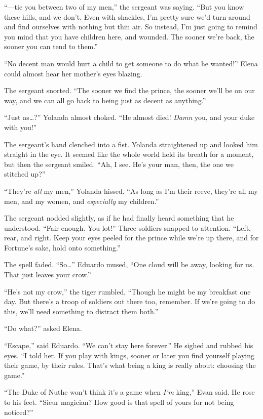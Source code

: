 \documentclass[10pt]{book}
\begin{document}
``---tie you between two of my men,'' the sergeant was saying. ``But you know these hills, and we don't. Even with shackles, I'm pretty sure we'd turn around and find ourselves with nothing but thin air. So instead, I'm just going to remind you mind that you have children here, and wounded.  The sooner we're back, the sooner you can tend to them.''

``No decent man would hurt a child to get someone to do what he wanted!''  Elena could almost hear her mother's eyes blazing.

The sergeant snorted. ``The sooner we find the prince, the sooner we'll be on our way, and we can all go back to being just as decent as anything.''

``Just as{\ldots}?'' Yolanda almost choked. ``He almost died! \emph{Damn} you, and your duke with you!''

The sergeant's hand clenched into a fist. Yolanda straightened up and looked him straight in the eye. It seemed like the whole world held its breath for a moment, but then the sergeant smiled. ``Ah, I see. He's your man, then, the one we stitched up?''

``They're \emph{all} my men,'' Yolanda hissed. ``As long as I'm their reeve, they're all my men, and my women, and \emph{especially} my children.''

The sergeant nodded slightly, as if he had finally heard something that he understood.  ``Fair enough.  You lot!''  Three soldiers snapped to attention.  ``Left, rear, and right.  Keep your eyes peeled for the prince while we're up there, and for Fortune's sake, hold onto something.''

The spell faded.  ``So{\ldots}'' Eduardo mused, ``One cloud will be away, looking for us.  That just leaves your crow.''

``He's not my crow,'' the tiger rumbled, ``Though he might be my breakfast one day.  But there's a troop of soldiers out there too, remember.  If we're going to do this, we'll need something to distract them both.''

``Do what?'' asked Elena.

``Escape,'' said Eduardo. ``We can't stay here forever.'' He sighed and rubbed his eyes. ``I told her. If you play with kings, sooner or later you find yourself playing their game, by their rules. That's what being a king is really about: choosing the game.''

``The Duke of Nuthe won't think it's a game when \emph{I'm} king,'' Evan said.  He rose to his feet.  ``Sieur magician?  How good is that spell of yours for not being noticed?''
\end{document}
